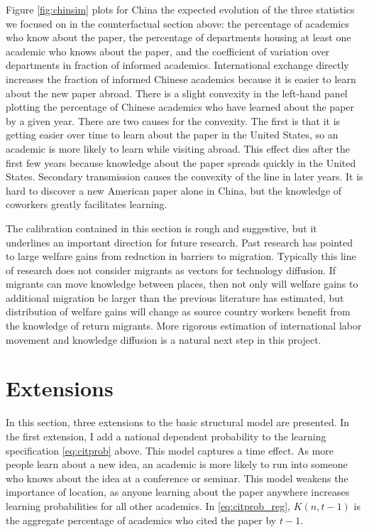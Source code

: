 Figure \ref{fig:chinsim} plots for China the expected evolution of the three 
statistics we focused on in the counterfactual section above: the percentage of academics
who know about the paper, the percentage of departments housing at least one academic 
who knows about the paper, and the coefficient of variation over departments in fraction 
of informed academics.  International exchange
 directly increases the fraction of informed Chinese academics because it is
 easier to learn about the new paper abroad.  There is a slight convexity in the 
left-hand panel plotting the percentage of Chinese academics who have learned about
the paper by a given year.
There are two causes for the convexity.  The first is that it is getting easier 
over time to learn about the paper in the United States, so an academic is more likely
to learn while visiting abroad.  This effect dies after the first few years because
knowledge about the paper spreads quickly in the United States.  Secondary transmission
causes the convexity of the line in later years.  It is hard
to discover a new American paper alone in China, but the knowledge of coworkers greatly
facilitates learning.

The calibration contained in this section is rough and suggestive, but it underlines an important
 direction for future research.  Past research has pointed to large welfare gains from
reduction in barriers to migration.\citep{clemens2011economics}  Typically this
 line of research does not consider migrants as vectors for technology diffusion.  If migrants 
can move knowledge between places, then not only will welfare gains to additional
migration be larger than the previous literature has estimated, but distribution of welfare gains 
will change as source country workers benefit from the knowledge
of return migrants.  More rigorous estimation of international labor movement and
 knowledge diffusion is a natural next step in this project.

\section{Extensions}
\label{sec:extensions}

In this section, three extensions to the basic structural model are
presented. In the first extension, I add a national dependent probability
to the learning specification \eqref{eq:citprob} above. This model
captures a time effect.  As more people learn about a new idea, an academic is more likely to run into
someone who knows about the idea at a conference or seminar. This model weakens the importance of location,
as anyone learning about the paper anywhere increases learning probabilities for all other academics.  In
\eqref{eq:citprob_reg}, $K(n,t-1)$ is the aggregate percentage of academics who cited the paper by $t-1$.

